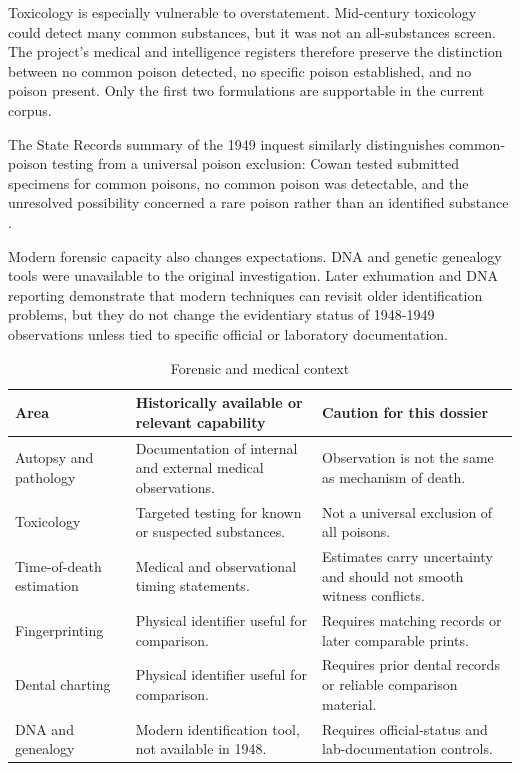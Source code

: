 Toxicology is especially vulnerable to overstatement. Mid-century toxicology could detect many common substances, but it was not an all-substances screen. The project's medical and intelligence registers therefore preserve the distinction between no common poison detected, no specific poison established, and no poison present. Only the first two formulations are supportable in the current corpus.

The State Records summary of the 1949 inquest similarly distinguishes common-poison testing from a universal poison exclusion: Cowan tested submitted specimens for common poisons, no common poison was detectable, and the unresolved possibility concerned a rare poison rather than an identified substance \parencite{src-src-0003,doc-doc-0001}.

Modern forensic capacity also changes expectations. DNA and genetic genealogy tools were unavailable to the original investigation. Later exhumation and DNA reporting demonstrate that modern techniques can revisit older identification problems, but they do not change the evidentiary status of 1948-1949 observations unless tied to specific official or laboratory documentation.

\begin{table}[htbp]
\centering
\caption{Forensic and medical context}
\label{tab:context-forensic-capabilities}
\begin{tabularx}{\textwidth}{p{}X p{}}
\toprule
Area & Historically available or relevant capability & Caution for this dossier \\
\midrule
Autopsy and pathology & Documentation of internal and external medical observations. & Observation is not the same as mechanism of death. \\
Toxicology & Targeted testing for known or suspected substances. & Not a universal exclusion of all poisons. \\
Time-of-death estimation & Medical and observational timing statements. & Estimates carry uncertainty and should not smooth witness conflicts. \\
Fingerprinting & Physical identifier useful for comparison. & Requires matching records or later comparable prints. \\
Dental charting & Physical identifier useful for comparison. & Requires prior dental records or reliable comparison material. \\
DNA and genealogy & Modern identification tool, not available in 1948. & Requires official-status and lab-documentation controls. \\
\bottomrule
\end{tabularx}
\end{table}


